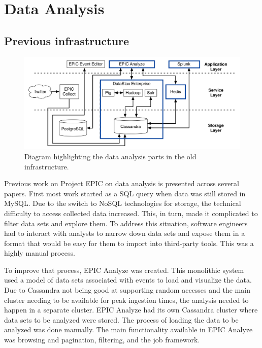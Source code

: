 \section{Data Analysis}

\subsection{Previous infrastructure}

\begin{figure}[htbp]
	\caption{\label{fig:oldinfaranalysis}
	Diagram highlighting the data analysis parts in the old infrastructure.
	}
    \begin{center}
	\includegraphics[width=150mm]{figs/old-arch-analysis.png}
    \end{center}
\label{xfigDiagram}
\end{figure}


Previous work on Project EPIC on data analysis is presented across several papers. First most work started as a SQL query when data was still stored in MySQL. Due to the switch to NoSQL technologies for storage, the technical difficulty to access collected data increased. This, in turn, made it complicated to filter data sets and explore them. To address this situation, software engineers had to interact with analysts to narrow down data sets and expose them in a format that would be easy for them to import into third-party tools. This was a highly manual process. 

To improve that process, EPIC Analyze was created. This monolithic system used a model of data sets associated with events to load and visualize the data. Due to Cassandra not being good at supporting random accesses and the main cluster needing to be available for peak ingestion times, the analysis needed to happen in a separate cluster. EPIC Analyze had its own Cassandra cluster where data sets to be analyzed were stored. The process of loading the data to be analyzed was done manually. The main functionality available in EPIC Analyze was browsing and pagination, filtering, and the job framework.

